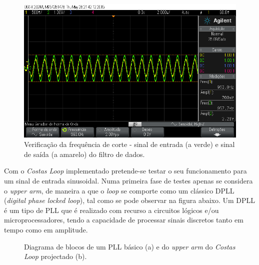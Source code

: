 \documentclass[11pt]{article}
\numberwithin{equation}{section}
\begin{document}
\begin{figure}[H]
	\centering
	\includegraphics[keepaspectratio=true, scale=0.37]{exps/filtro_1k_freqcorte}
	\caption{Verificação da frequência de corte - sinal de entrada (a verde) e sinal de saída (a amarelo) do filtro de dados.}
	\vspace{-0.8em}
\end{figure} 


Com o \textit{Costas Loop} implementado pretende-se testar o seu funcionamento para um sinal de entrada sinusoidal. Numa primeira fase de testes apenas se considera o \textit{upper arm}, de maneira a que o \textit{loop} se comporte como um clássico DPLL (\textit{digital phase locked loop}), tal como se pode observar na figura abaixo. Um DPLL é um tipo de PLL que é realizado com recurso a circuitos lógicos e/ou microprocessadores, tendo a capacidade de processar sinais discretos tanto em tempo como em amplitude.

\begin{figure}[H]
	\centering
	\hspace{8mm}
	\vspace{-0.8em}
	\caption{Diagrama de blocos de um PLL básico (a) e do \textit{upper arm} do \textit{Costas Loop} projectado (b).}
	\vspace{-0.8em}
\end{figure}
\end{document}
